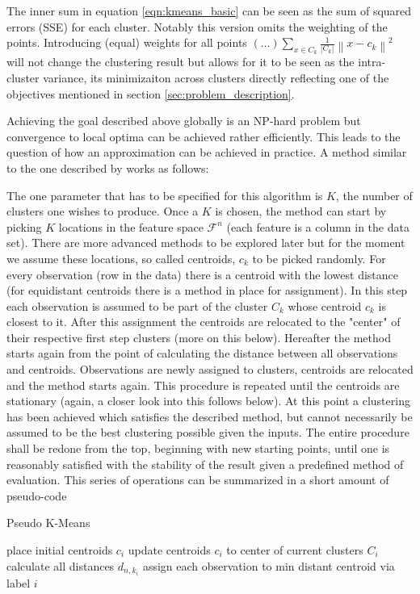 The inner sum in equation \ref{eqn:kmeans_basic} can be seen as the sum of squared errors (SSE) for each cluster. Notably this version omits the weighting of the points. Introducing (equal) weights for all points $(\dots)\sum_{x \in C_{k}}^{} \frac{1}{\left | C_{k} \right |} \left \| x - c_{k} \right \|^2$ will not change the clustering result but allows for it to be seen as the intra-cluster variance, its minimizaiton across clusters directly reflecting one of the objectives mentioned in section \ref{sec:problem_description}.

Achieving the goal described above globally is an NP-hard problem but convergence to local optima can be achieved rather efficiently. This leads to the question of how an approximation can be achieved in practice. A method similar to the one described by \cite{lloyd1982least,wu2012advances} works as follows:

The one parameter that has to be specified for this algorithm is $K$, the number of clusters one wishes to produce. Once a $K$ is chosen, the method can start by picking $K$ locations in the feature space $\mathcal{F}^{n}$ (each feature is a column in the data set). There are more advanced methods to be explored later but for the moment we assume these locations, so called centroids, $c_{k}$ to be picked randomly.
For every observation (row in the data) there is a centroid with the lowest distance (for equidistant centroids there is a method in place for assignment). In this step each observation is assumed to be part of the cluster $C_{k}$ whose centroid $c_{k}$ is closest to it. After this assignment the centroids are relocated to the "center" of their respective first step clusters (more on this below). Hereafter the method starts again from the point of calculating the distance between all observations and centroids. Observations are newly assigned to clusters, centroids are relocated and the method starts again. This procedure is repeated until the centroids are stationary (again, a closer look into this follows below). At this point a clustering has been achieved which satisfies the described method, but cannot necessarily be assumed to be the best clustering possible given the inputs. The entire procedure shall be redone from the top, beginning with new starting points, until one is reasonably satisfied with the stability of the result given a predefined method of evaluation. This series of operations can be summarized in a short amount of pseudo-code
\begin{algorithm}
\caption{Pseudo K-Means}\label{euclid}
\begin{algorithmic}[1]
\State place initial centroids $c_{i}$ 
\State update centroids $c_{i}$ to center of current clusters $C_{i}$ 
\EndIf
\State calculate all distances $d_{n, k_{i}}$ 
\State assign each observation to min distant centroid via label $i$
\EndWhile
\end{algorithmic}
\end{algorithm}

